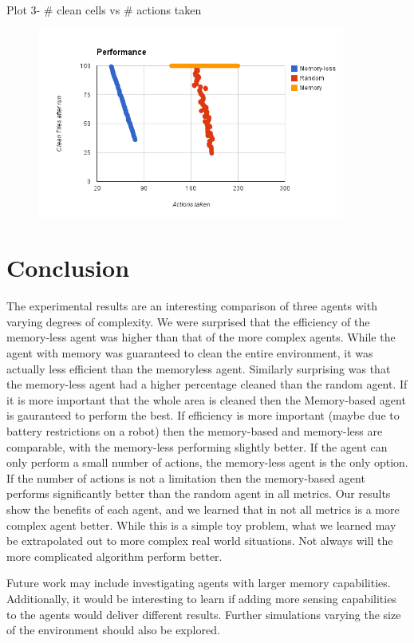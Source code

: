 \documentclass[a4paper,10pt]{article}
\begin{document}
Plot 3- \# clean cells vs \# actions taken
\begin{figure}[H]
	\includegraphics[width=0.9\textwidth]{image2.png}
\end{figure}

\section{Conclusion}
The experimental results are an interesting comparison of three agents with varying degrees of complexity.
We were surprised that the efficiency of the memory-less agent was higher than that of the more complex agents.
While the agent with memory was guaranteed to clean the entire environment, it was actually less efficient than the memoryless agent.
Similarly surprising was that the memory-less agent had a higher percentage cleaned than the random agent.
If it is more important that the whole area is cleaned then the Memory-based agent is gauranteed to perform the best.
If efficiency is more important (maybe due to battery restrictions on a robot) then the memory-based and memory-less are comparable, with the memory-less performing slightly better.
If the agent can only perform a small number of actions, the memory-less agent is the only option.
If the number of actions is not a limitation then the memory-based agent performs significantly better than the random agent in all metrics.
Our results show the benefits of each agent, and we learned that in not all metrics is a more complex agent better.
While this is a simple toy problem, what we learned may be extrapolated out to more complex real world situations.
Not always will the more complicated algorithm perform better.

Future work may include investigating agents with larger memory capabilities.
Additionally, it would be interesting to learn if adding more sensing capabilities to the agents would deliver different results.
Further simulations varying the size of the environment should also be explored.

\end{document}
